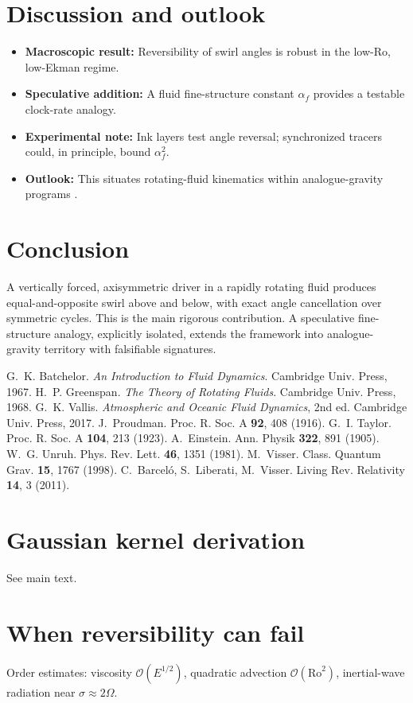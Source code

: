 \documentclass[12pt]{article}
\begin{document}
    \section{Discussion and outlook}
    \begin{itemize}
        \item \textbf{Macroscopic result:} Reversibility of swirl angles is robust in the low-Ro, low-Ekman regime.
        \item \textbf{Speculative addition:} A fluid fine-structure constant $\alpha_f$ provides a testable clock-rate analogy.
        \item \textbf{Experimental note:} Ink layers test angle reversal; synchronized tracers could, in principle, bound $\alpha_f^2$.
        \item \textbf{Outlook:} This situates rotating-fluid kinematics within analogue-gravity programs \cite{Unruh1981,Visser1998,Barcelo2011}.
    \end{itemize}

    \section*{Conclusion}
    A vertically forced, axisymmetric driver in a rapidly rotating fluid produces equal-and-opposite swirl above and below, with exact angle cancellation over symmetric cycles. This is the main rigorous contribution. A speculative fine-structure analogy, explicitly isolated, extends the framework into analogue-gravity territory with falsifiable signatures.

    
    \begin{thebibliography}{99}
         G.~K. Batchelor. \emph{An Introduction to Fluid Dynamics}. Cambridge Univ. Press, 1967.
         H.~P. Greenspan. \emph{The Theory of Rotating Fluids}. Cambridge Univ. Press, 1968.
         G.~K. Vallis. \emph{Atmospheric and Oceanic Fluid Dynamics}, 2nd ed. Cambridge Univ. Press, 2017.
         J.~Proudman. Proc. R. Soc. A \textbf{92}, 408 (1916).
         G.~I. Taylor. Proc. R. Soc. A \textbf{104}, 213 (1923).
         A.~Einstein. Ann. Physik \textbf{322}, 891 (1905).
         W.~G. Unruh. Phys. Rev. Lett. \textbf{46}, 1351 (1981).
         M.~Visser. Class. Quantum Grav. \textbf{15}, 1767 (1998).
         C.~Barcel\'o, S.~Liberati, M.~Visser. Living Rev. Relativity \textbf{14}, 3 (2011).
    \end{thebibliography}

    \clearpage
    \appendix
    \section{Gaussian kernel derivation}
    See main text.

    \section{When reversibility can fail}
    Order estimates: viscosity $\mathcal{O}(E^{1/2})$, quadratic advection $\mathcal{O}(\mathrm{Ro}^2)$, inertial-wave radiation near $\sigma\approx 2\Omega$.
\end{document}
